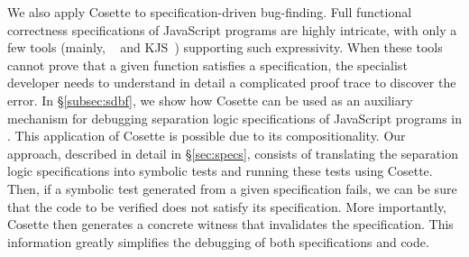 \documentclass[sigconf, review]{acmart}
\newcommand{\polish}[1]{{\color{red}#1}}
\newcommand{\cosette}{Cosette\xspace}
\newcommand{\pgmaxinline}[1]{ {\color{purple} *** PG : #1 ***} }
\newcommand{\pmaxinline}[1]{ {\color{blue} *** PM : #1 ***} }
\begin{document}
%





We also apply Cosette to specification-driven bug-finding. 
Full functional correctness 
specifications of JavaScript programs are highly intricate, with only
a few tools (mainly, \javert~\cite{javert} and KJS~\cite{Park:2015,stefanescu:oopsla:2016}) supporting such expressivity. 
When these tools cannot prove that a given function satisfies
a specification, the specialist developer needs to
understand in detail a complicated proof trace to discover the error. 
In \S\ref{subsec:sdbf}, we show how
\cosette can be used as an auxiliary mechanism for debugging
separation logic specifications of JavaScript programs in \javert.
This application of Cosette is possible due 
to its compositionality.
Our approach, described in detail in \S\ref{sec:specs}, consists of
translating the separation logic specifications into symbolic tests
and running these tests using \cosette.  Then, if a symbolic test
generated from a given specification fails, we can be sure that the
code to be verified does not satisfy its specification.  More
importantly, \cosette then generates a concrete witness that
invalidates the specification. This information greatly simplifies the
debugging of both specifications and code.



%
%
\end{document}
